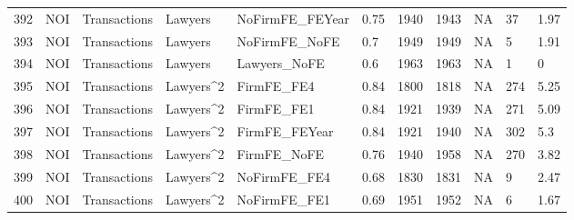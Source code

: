 \documentclass{article}
\begin{document}
\begin{table}[H]
\begin{tabular}{rllllllllll}
  392 & NOI & Transactions & Lawyers & NoFirmFE\_FEYear & 0.75 & 1940 & 1943 & NA & 37 & 1.97 \\
  393 & NOI & Transactions & Lawyers & NoFirmFE\_NoFE & 0.7 & 1949 & 1949 & NA & 5 & 1.91 \\
  394 & NOI & Transactions & Lawyers & Lawyers\_NoFE & 0.6 & 1963 & 1963 & NA & 1 & 0 \\
  395 & NOI & Transactions & Lawyers^2 & FirmFE\_FE4 & 0.84 & 1800 & 1818 & NA & 274 & 5.25 \\
  396 & NOI & Transactions & Lawyers^2 & FirmFE\_FE1 & 0.84 & 1921 & 1939 & NA & 271 & 5.09 \\
  397 & NOI & Transactions & Lawyers^2 & FirmFE\_FEYear & 0.84 & 1921 & 1940 & NA & 302 & 5.3 \\
  398 & NOI & Transactions & Lawyers^2 & FirmFE\_NoFE & 0.76 & 1940 & 1958 & NA & 270 & 3.82 \\
  399 & NOI & Transactions & Lawyers^2 & NoFirmFE\_FE4 & 0.68 & 1830 & 1831 & NA & 9 & 2.47 \\
  400 & NOI & Transactions & Lawyers^2 & NoFirmFE\_FE1 & 0.69 & 1951 & 1952 & NA & 6 & 1.67 \\
   \hline
\end{tabular}
\end{table}
\end{document}
